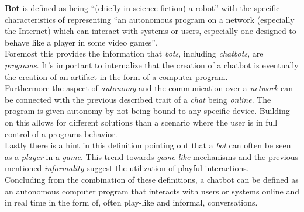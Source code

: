 \textbf{Bot} is defined as being ``(chiefly in science fiction) a robot'' with the specific characteristics of representing ``an autonomous program on a network (especially the Internet) which can interact with systems or users, especially one designed to behave like a player in some video games''\cite{oxfordbot},
\\

Foremost this provides the information that \emph{bots}, including \emph{chatbots}, are \emph{programs}.
It's important to internalize that the creation of a chatbot is eventually the creation of an artifact in the form of a computer program.
\\

Furthermore the aspect of \emph{autonomy} and the communication over a \emph{network} can be connected with the previous described trait of a \emph{chat} being \emph{online}.
The program is given autonomy by not being bound to any specific device.
Building on this allows for different solutions than a scenario where the user is in full control of a programs behavior.
\\

Lastly there is a hint in this definition pointing out that a \emph{bot} can often be seen as a \emph{player} in a \emph{game}.
This trend towards \emph{game-like} mechanisms and the previous mentioned \emph{informality} suggest the utilization of playful interactions.
\\

Concluding from the combination of these definitions, a chatbot can be defined as an autonomous computer program that interacts with users or systems online and in real time in the form of, often play-like and informal, conversations.
